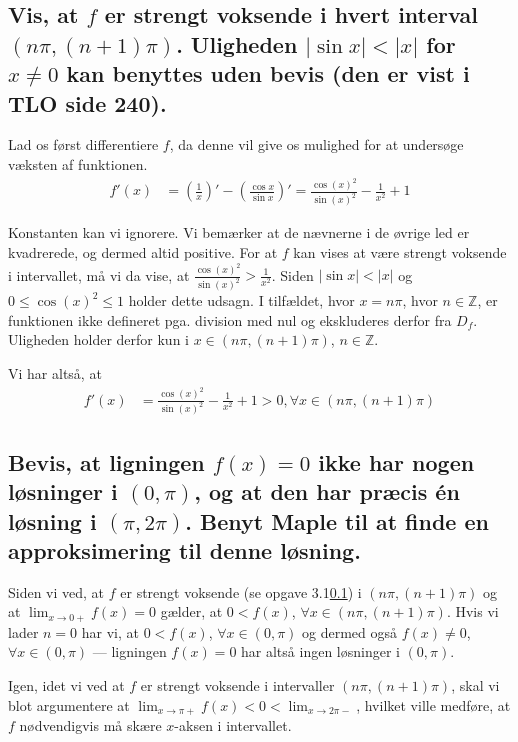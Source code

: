 \documentclass[11pt,a4paper]{article}
\newcommand{\modulus}[1]{\lvert#1\rvert}
\newcommand{\limit}[2]{\lim_{#1 \rightarrow #2}}
\begin{document}
\subsection
{
    \mdseries
    Vis, at $f$ er strengt voksende i hvert interval $(n\pi,(n+1)\pi)$.
    Uligheden $\modulus{\sin x} < \modulus{x}$ for $x \neq 0$ kan benyttes
    uden bevis (den er vist i TLO side 240).
}
\label{sec:3|sub:1|ass:b}
Lad os først differentiere $f$, da denne vil give os mulighed for at
undersøge væksten af funktionen.
\begin{align}
    f'(x) &= \left( \frac{1}{x} \right)'
           - \left( \frac{\cos x}{\sin x} \right)'
           = \frac{\cos(x)^2}{\sin(x)^2} - \frac{1}{x^2} + 1
\end{align}

Konstanten kan vi ignorere. Vi bemærker at de nævnerne i de øvrige led er
kvadrerede, og dermed altid positive. For at $f$ kan vises at være strengt
voksende i intervallet, må vi da vise, at $\frac{\cos(x)^2}{\sin(x)^2} >
\frac{1}{x^2}$. Siden $\modulus{\sin x} < \modulus{x}$ og $0 \leq \cos(x)^2
\leq 1$ holder dette udsagn. I tilfældet, hvor $x = n\pi$, hvor $n \in
\mathbb{Z}$, er funktionen ikke defineret pga. division med nul og ekskluderes
derfor fra $D_f$. Uligheden holder derfor kun i $x \in (n\pi, (n+1)\pi)$, $n
\in \mathbb{Z}$.

Vi har altså, at
\begin{align}
    f'(x) &= \frac{\cos(x)^2}{\sin(x)^2} - \frac{1}{x^2} + 1 > 0
          , \forall x \in (n\pi, (n+1)\pi)
\end{align}

\subsection
{
    \mdseries
    Bevis, at ligningen $f(x) = 0$ ikke har nogen løsninger i $(0, \pi)$, og
    at den har præcis én løsning i $(\pi,2\pi)$. Benyt Maple til at finde en
    approksimering til denne løsning.
}
Siden vi ved, at $f$ er strengt voksende (se opgave 3.1\ref{sec:3|sub:1|ass:b})
i $(n\pi,(n+1)\pi)$ og at $\limit{x}{0+} f(x) = 0$ gælder, at $0 < f(x)$,
$\forall x \in (n\pi,(n+1)\pi)$. Hvis vi lader $n=0$ har vi, at $0 < f(x)$,
$\forall x \in (0,\pi)$ og dermed også $f(x) \neq 0$, $\forall x \in (0,\pi)$
--- ligningen $f(x) = 0$ har altså ingen løsninger i $(0,\pi)$.

Igen, idet vi ved at $f$ er strengt voksende i intervaller $(n\pi,(n+1)\pi)$,
skal vi blot argumentere at $\limit{x}{\pi+} f(x) < 0 < \limit{x}{2\pi-}$,
hvilket ville medføre, at $f$ nødvendigvis må skære $x$-aksen i intervallet.
\end{document}
